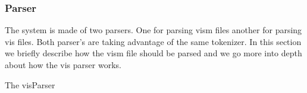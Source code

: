 


\subsubsection{Parser}

The system is made of two parsers. One for parsing vism files another for parsing vis files. Both parser's are taking advantage of the same tokenizer. In this section we briefly describe how the vism file should be parsed and we go more into depth about how the vis parser works.



The visParser 